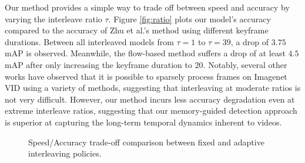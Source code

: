 \documentclass[10pt,twocolumn,letterpaper]{article}
\begin{document}
Our method provides a simple way to trade off between speed and accuracy by varying the interleave ratio $\tau$. Figure \ref{fig:ratio} plots our model's accuracy compared to the accuracy of Zhu et al.'s method using different keyframe durations. Between all interleaved models from $\tau=1$ to $\tau=39$, a drop of $3.75$ mAP is observed. Meanwhile, the flow-based method suffers a drop of at least $4.5$ mAP after only increasing the keyframe duration to $20$. Notably, several other works \cite{feichtenhofer2017detect, chen2018optimizing} have observed that it is possible to sparsely process frames on Imagenet VID using a variety of methods, suggesting that interleaving at moderate ratios is not very difficult. However, our method incurs less accuracy degradation even at extreme interleave ratios, suggesting that our memory-guided detection approach is superior at capturing the long-term temporal dynamics inherent to videos.


\begin{figure}[t]
\centering
{}
\centering
\vspace{-.5em}
\caption{Speed/Accuracy trade-off comparison between fixed and adaptive interleaving policies.}
\label{fig:rlgraph}
\end{figure}
\end{document}
